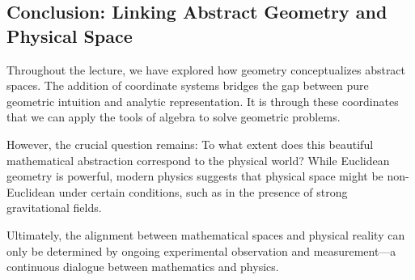 \documentclass[12pt,a4paper]{article}
\begin{document}
\subsection{Conclusion: Linking Abstract Geometry and Physical Space}
Throughout the lecture, we have explored how geometry conceptualizes abstract spaces. The addition of coordinate systems bridges the gap between pure geometric intuition and analytic representation. It is through these coordinates that we can apply the tools of algebra to solve geometric problems.

However, the crucial question remains: To what extent does this beautiful mathematical abstraction correspond to the physical world? While Euclidean geometry is powerful, modern physics suggests that physical space might be non-Euclidean under certain conditions, such as in the presence of strong gravitational fields.

Ultimately, the alignment between mathematical spaces and physical reality can only be determined by ongoing experimental observation and measurement—a continuous dialogue between mathematics and physics.
\end{document}

